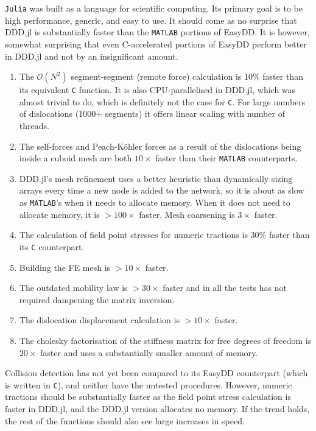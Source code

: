 \texttt{Julia} was built as a language for scientific computing. Its primary goal is to be high performance, generic, and easy to use. It should come as no surprise that DDD.jl is substantially faster than the \texttt{MATLAB} portions of EasyDD. It is however, somewhat surprising that even C-accelerated portions of EasyDD perform better in DDD.jl and not by an insignificant amount.
\begin{enumerate}
    \item The $\mathcal{O}(N^2)$ segment-segment (remote force) calculation is 10\% faster than its equivalent \texttt{C} function. It is also CPU-parallelised in DDD.jl, which was almost trivial to do, which is definitely not the case for \texttt{C}. For large numbers of dislocations (1000+ segments) it offers linear scaling with number of threads.
    \item The self-forces and Peach-K\"{o}hler forces as a result of the dislocations being inside a cuboid mesh are both $10\times$ faster than their \texttt{MATLAB} counterparts.
    \item DDD.jl's mesh refinement uses a better heuristic than dynamically sizing arrays every time a new node is added to the network, so it is about as slow as \texttt{MATLAB}'s when it needs to allocate memory. When it does not need to allocate memory, it is $>100\times$ faster. Mesh coarsening is $3\times$ faster.
    \item The calculation of field point stresses for numeric tractions is $30\%$ faster than its \texttt{C} counterpart.
    \item Building the FE mesh is $>10\times$ faster.
    \item The outdated mobility law is $>30\times$ faster and in all the tests has not required dampening the matrix inversion.
    \item The dislocation displacement calculation is $>10\times$ faster.
    \item The cholesky factorisation of the stiffness matrix for free degrees of freedom is $20\times$ faster and uses a substantially smaller amount of memory.
\end{enumerate}
Collision detection has not yet been compared to its EasyDD counterpart (which is written in \texttt{C}), and neither have the untested procedures. However, numeric tractions should be substantially faster as the field point stress calculation is faster in DDD.jl, and the DDD.jl version allocates no memory. If the trend holds, the rest of the functions should also see large increases in speed.

